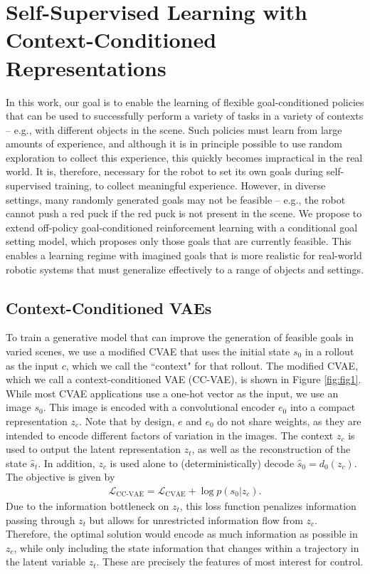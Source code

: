 \section{Self-Supervised Learning with Context-Conditioned Representations}

In this work, our goal is to enable the learning of flexible goal-conditioned policies that can be used to successfully perform a variety of tasks in a variety of contexts -- e.g., with different objects in the scene. Such policies must learn from large amounts of experience, and although it is in principle possible to use random exploration to collect this experience, this quickly becomes impractical in the real world.
It is, therefore, necessary for the robot to set its own goals during self-supervised training, to collect meaningful experience. However, in diverse settings, many randomly generated goals may not be feasible -- e.g., the robot cannot push a red puck if the red puck is not present in the scene.
We propose to extend off-policy goal-conditioned reinforcement learning with a conditional goal setting model, which proposes only those goals that are currently feasible. This enables a learning regime with imagined goals that is more realistic for real-world robotic systems that must generalize effectively to a range of objects and settings.

\subsection{Context-Conditioned VAEs}
\label{sec:ccvae}

To train a generative model that can improve the generation of feasible goals in varied scenes, we use a modified CVAE that uses the initial state $s_{0}$ in a rollout as the input $c$, which we call the ``context" for that rollout.
The modified CVAE, which we call a context-conditioned VAE (CC-VAE), is shown in Figure \ref{fig:fig1}. While most CVAE applications use a one-hot vector as the input, we use an image $s_0$. This image is encoded with a convolutional encoder $e_0$ into a compact representation $z_c$. Note that by design, $e$ and $e_0$ do not share weights, as they are intended to encode different factors of variation in the images. The context $z_c$ is used to output the latent representation $z_t$, as well as the reconstruction of the state $\hat{s}_t$. In addition, $z_c$ is used alone to (deterministically) decode $\hat{s}_0 = d_0(z_c)$. The objective is given by
\begin{align} \label{eq:cc-vae-loss}
    \mathcal L_\text{CC-VAE} = \mathcal L_\text{CVAE} + \log p(s_0|z_c).
\end{align}
Due to the information bottleneck on $z_t$, this loss function penalizes information passing through $z_t$ but allows for unrestricted information flow from $z_c$. Therefore, the optimal solution would encode as much information as possible in $z_c$, while only including the state information that changes within a trajectory in the latent variable $z_t$. These are precisely the features of most interest for control.


